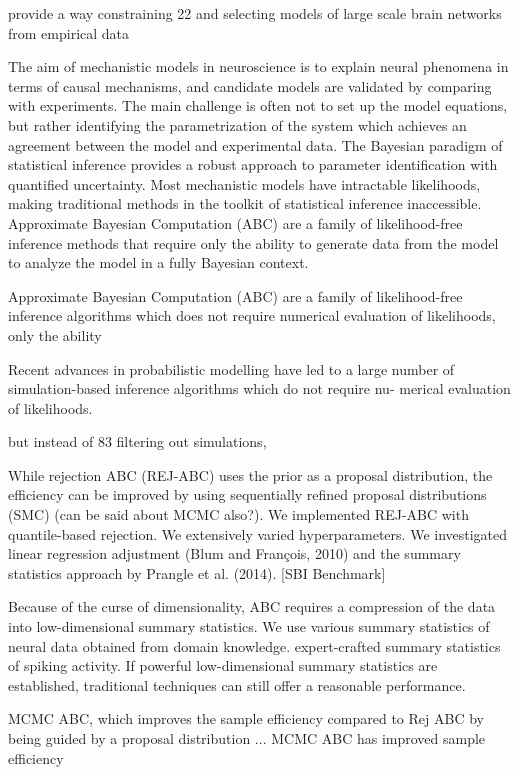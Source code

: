 provide a way constraining
22 and selecting models of large scale brain networks from empirical data

The aim of mechanistic models in neuroscience is to explain neural phenomena in terms of causal mechanisms, and candidate models are validated by comparing with experiments. The main challenge is often not to set up the model equations, but rather identifying the parametrization of the system which achieves an agreement between the model and experimental data. The Bayesian paradigm of statistical inference provides a robust approach to parameter identification with quantified uncertainty. Most mechanistic models have intractable likelihoods, making traditional methods in the toolkit of statistical inference inaccessible. Approximate Bayesian Computation (ABC) are a family of likelihood-free inference methods that require only the ability to generate data from the model to analyze the model in a fully Bayesian context.

Approximate Bayesian Computation (ABC) are a family of likelihood-free inference algorithms which does not require numerical evaluation of likelihoods, only the ability 

Recent advances in probabilistic modelling have led to a large number of simulation-based inference algorithms which do not require nu- merical evaluation of likelihoods. 

but instead of
83 filtering out simulations,

While rejection ABC (REJ-ABC) uses the prior as a proposal distribution, the efficiency can be improved by using sequentially refined proposal distributions (SMC) (can be said about MCMC also?). We implemented REJ-ABC with quantile-based rejection. 
We extensively varied hyperparameters. We investigated linear regression adjustment (Blum and François, 2010) and the summary statistics approach
by Prangle et al. (2014). [SBI Benchmark]



Because of the curse of dimensionality, ABC requires a compression of the data into low-dimensional summary statistics. We use various summary statistics of neural data obtained from domain knowledge.  expert-crafted summary statistics of spiking activity. If powerful low-dimensional summary statistics are established, traditional techniques can still offer a reasonable performance.

MCMC ABC, which improves the sample efficiency compared to Rej ABC by being guided by a proposal distribution ... MCMC ABC has improved sample efficiency 



